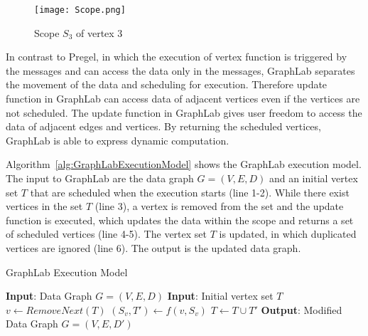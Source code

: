 \begin{figure}[H]
  \begin{center}
    \texttt{[image: Scope.png]}
    \caption{Scope $S_3$ of vertex 3}
    \label{fig:Scope}
  \end{center}
\end{figure}

In contrast to Pregel, in which the execution of vertex function is triggered by the messages and can access the data only in the messages, GraphLab separates the movement of the data and scheduling for execution. Therefore update function in GraphLab can access data of adjacent vertices even if the vertices are not scheduled. The update function in GraphLab gives user freedom to access the data of adjacent edges and vertices. By returning the scheduled vertices, GraphLab is able to express dynamic computation. 

Algorithm~\vref{alg:GraphLabExecutionModel}\cite{Low+al:uai10graphlab} shows the GraphLab execution model. The input to GraphLab are the data graph $G=(V,E,D)$ and an initial vertex set $T$ that are scheduled when the execution starts (line 1-2). While there exist vertices in the set $T$ (line 3), a vertex is removed from the set and the update function is executed, which updates the data within the scope and returns a set of scheduled vertices (line 4-5). The vertex set $T$ is updated, in which duplicated vertices are ignored (line 6). The output is the updated data graph. 

	\begin{Algorithmus}[H]
	\label{alg:GraphLabExecutionModel}
	\caption{GraphLab Execution Model}	
	\begin{algorithmic}[1]
	\State \textbf{Input}: Data Graph $G=(V,E,D)$
	\State \textbf{Input}: Initial vertex set $T$
		\State $v \leftarrow RemoveNext(T)$
		\State $(S_v, T') \leftarrow f(v,S_v)$
		\State $T \leftarrow T \cup T'$
	\EndWhile
	\State \textbf{Output}: Modified Data Graph $G=(V,E,D')$
	\end{algorithmic}	
	\end{Algorithmus}

